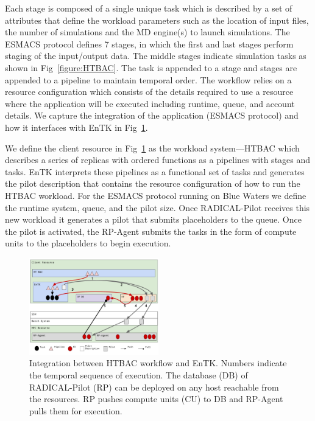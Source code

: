 Each stage is composed of a single unique task which is described by a set of
attributes that define the workload parameters such as the location of input
files, the number of simulations and the MD engine(s) to launch simulations.
The ESMACS protocol defines 7 stages, in which the first and last
stages perform staging of the input/output data. The middle stages indicate
simulation tasks as shown in Fig~\ref{figure:HTBAC}. The task is
appended to a stage and stages are appended to a pipeline to maintain
temporal order. The workflow relies on a resource configuration which
consists of the details required to use a resource where the application will
be executed including runtime, queue, and account details. We capture the
integration of the application (ESMACS protocol) and how it interfaces with
EnTK in Fig~\ref{figure:ht-bac_rp}.



We define the client resource in Fig~\ref{figure:ht-bac_rp} as the workload
system---HTBAC which describes a series of replicas with ordered functions as
a pipelines with stages and tasks. EnTK interprets these pipelines as a
functional set of tasks and generates the pilot description that contains the
resource configuration of how to run the HTBAC workload. For the ESMACS
protocol running on Blue Waters we define the runtime system, queue, and the
pilot size. Once RADICAL-Pilot receives this new workload it generates a
pilot that submits placeholders to the queue. Once the pilot is activated,
the RP-Agent submits the tasks in the form of compute units to the
placeholders to begin execution.


\begin{figure}
\centering
  \includegraphics[width=0.5\textwidth]{FIGURES/ht-bac-rp_integration.pdf}
  \caption{Integration between HTBAC workflow and EnTK\@. Numbers
  indicate the temporal sequence of execution. The database (DB) of
  RADICAL-Pilot (RP) can be deployed on any host reachable from the
  resources. RP pushes compute units (CU) to DB and RP-Agent pulls them for
  execution. }\label{figure:ht-bac_rp}
\end{figure}


